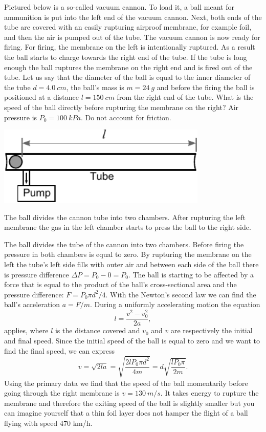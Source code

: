 {\ifEngStatement
Pictured below is a so-called vacuum cannon. To load it, a ball meant for ammunition is put into the left end of the vacuum cannon. Next, both ends of the tube are covered with an easily rupturing airproof membrane, for example foil, and then the air is pumped out of the tube. The vacuum cannon is now ready for firing. For firing, the membrane on the left is intentionally ruptured. As a result the ball starts to charge towards the right end of the tube. If the tube is long enough the ball ruptures the membrane on the right end and is fired out of the tube. Let us say that the diameter of the ball is equal to the inner diameter of the tube $d=\SI{4,0}{cm}$, the ball’s mass is $m=\SI{24}{g}$ and before the firing the ball is positioned at a distance $l=\SI{150}{cm}$ from the right end of the tube. What is the speed of the ball directly before rupturing the membrane on the right? Air pressure is $P_0=\SI{100}{kPa}$. Do not account for friction.
\begin{center}
  \includegraphics[width=0.75\textwidth]{2014-lahg-02-vaakumkahur_ing}
\end{center}
\fi


\ifEngHint
The ball divides the cannon tube into two chambers. After rupturing the left membrane the gas in the left chamber starts to press the ball to the right side.
\fi


\ifEngSolution
The ball divides the tube of the cannon into two chambers. Before firing the pressure in both chambers is equal to zero. By rupturing the membrane on the left the tube’s left side fills with outer air and between each side of the ball there is pressure difference $\Delta P=P_0-0=P_0$. The ball is starting to be affected by a force that is equal to the product of the ball’s cross-sectional area and the pressure difference: $F=P_0\pi d^2/4$. With the Newton’s second law we can find the ball’s acceleration $a=F/m$. During a uniformly accelerating motion the equation 
\[ l=\frac{v^2-v_0^2}{2a}, \] 
applies, where $l$ is the distance covered and $v_0$ and $v$ are respectively the initial and final speed. Since the initial speed of the ball is equal to zero and we want to find the final speed, we can express 
\[ v=\sqrt{2la}=\sqrt{\frac{2lP_0\pi d^2}{4m}}=d\sqrt{\frac{lP_0\pi}{2m}}.\] 
Using the primary data we find that the speed of the ball momentarily before going through the right membrane is $v=\SI{130}{m/s}$. It takes energy to rupture the membrane and therefore the exiting speed of the ball is slightly smaller but you can imagine yourself that a thin foil layer does not hamper the flight of a ball flying with speed 470 km/h.
\fi
}